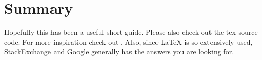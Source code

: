 \section{Summary}
Hopefully this has been a useful short guide. Please also check out the tex source code. For more inspiration check out \cite{WikibookLatex}. Also, since \LaTeX{} is so extensively used, StackExchange and Google generally has the answers you are looking for.
